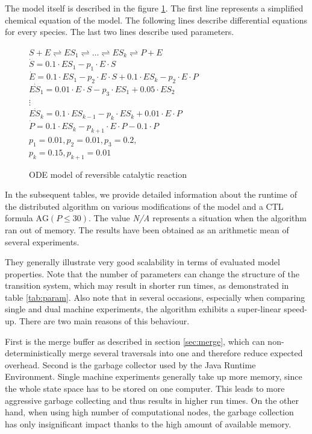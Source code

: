 \documentclass[12pt,oneside]{fithesis2}
\newcommand{\ag}[1]{\ensuremath{\mbox{AG} #1}}
\begin{document}
				The model itself is described in the figure \ref{fig:model}. The first line represents a simplified chemical equation of the model. The following lines describe differential equations for every species. The last two lines describe used parameters. 				


				\begin{figure}
					\label{fig:model}
					\centering
					\underline{$S + E \rightleftharpoons ES_1 \rightleftharpoons \dots \rightleftharpoons ES_k \rightleftharpoons P + E$}\\
					$\dot{S}  =  0.1\cdot ES_1 - p_1\cdot E\cdot S$\\
					$\dot{E}  =  0.1\cdot ES_1 - p_2\cdot E\cdot S + 0.1\cdot ES_k - p_2\cdot E\cdot P$\\
					$\dot{ES_1} = 0.01\cdot E\cdot S - p_3\cdot ES_1 + 0.05\cdot ES_2$\\
					$\vdots $\\
					$\dot{ES_k} = 0.1\cdot ES_{k -1} - p_k\cdot ES_k + 0.01\cdot E\cdot P$\\
					\underline{$\dot{P}  =  0.1\cdot ES_k - p_{k+1}\cdot E\cdot P - 0.1\cdot P$}\\
					$p_1 = 0.01, p_2 = 0.01, p_3 = 0.2,$\\ $p_k = 0.15, p_{k+1} = 0.01$
					\caption{ODE model of reversible catalytic reaction}
				\end{figure}


				In the subsequent tables, we provide detailed information about the runtime of the distributed algorithm on various modifications of the model and a CTL formula $\ag{(P \leq 30)}$.  The value {\em N/A} represents a situation when the algorithm ran out of memory. The results have been obtained as an arithmetic mean of several experiments.
				
				They generally illustrate very good scalability in terms of evaluated model properties. Note that the number of parameters can change the structure of the transition system, which may result in shorter run times, as demonstrated in table \ref{tab:param}. Also note that in several occasions, especially when comparing single and dual machine experiments, the algorithm exhibits a super-linear speed-up. There are two main reasons of this behaviour. 
				
				First is the merge buffer as described in section \ref{sec:merge}, which can non-deterministically merge several traversals into one and therefore reduce expected overhead. Second is the garbage collector used by the Java Runtime Environment. Single machine experiments generally take up more memory, since the whole state space has to be stored on one computer. This leads to more aggressive garbage collecting and thus results in higher run times. On the other hand, when using high number of computational nodes, the garbage collection has only insignificant impact thanks to the high amount of available memory.
				
\end{document}
